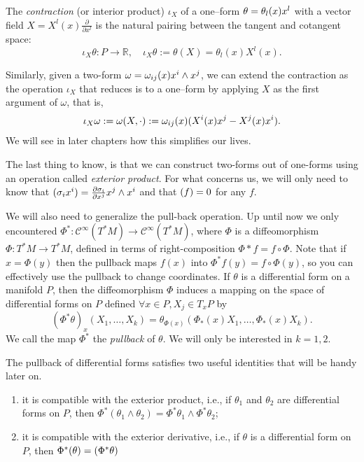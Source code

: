 \documentclass[english,fontsize=11pt,paper=a5,oneside]{scrbook}
\newcommand{\cC}{\mathcal{C}}
\newcommand{\R}{\mathbb{R}}
\let\d\relax
\newcommand{\d}{\mathrm{d}}
\theoremstyle{definition}
\begin{document}
The \emph{contraction} (or interior product) $\iota_X$ of a one--form $\theta = \theta_l(x)\d x^l$ with a vector field $X = X^l(x)\frac{\partial}{\partial x^l}$ is the natural pairing between the tangent and cotangent space:
\begin{equation}
  \iota_X \theta : P \to \R, \quad \iota_X \theta := \theta(X) = \theta_l(x) X^l(x).
\end{equation}

Similarly, given a two-form $\omega = \omega_{ij}(x) \d x^i\wedge \d x^j$, we can extend the contraction as the operation $\iota_X$ that reduces is to a one--form by applying $X$ as the first argument of $\omega$, that is,
\begin{equation}\label{eq:contraction}
  \iota_X \omega := \omega(X, \cdot) := \omega_{ij}(x)(X^i(x) \d x^j - X^j(x) \d x^i).
\end{equation}
We will see in later chapters how this simplifies our lives.

The last thing to know, is that we can construct two-forms out of one-forms using an operation called \emph{exterior product}.
For what concerns us, we will only need to know that $\d (\sigma_i \d x^i) = \frac{\partial \sigma_i}{\partial x^j} \d x^j \wedge \d x^i$ and that $\d (\d f) = 0$ for any $f$.

We will also need to generalize the pull-back operation.
Up until now we only encountered $\Phi^* : \cC^\infty(T^*M) \to \cC^\infty(T^*M)$, where $\Phi$ is a diffeomorphism $\Phi: T^*M \to T^*M$, defined in terms of right-composition $\Phi* f = f \circ \Phi$.
Note that if $x = \Phi(y)$ then the pullback maps $f(x)$ into $\Phi^* f (y) = f \circ \Phi (y)$, so you can effectively use the pullback to change coordinates.
%
If $\theta$ is a differential form on a manifold $P$, then the diffeomorphism $\Phi$ induces a mapping on the space of differential forms on $P$ defined $\forall x\in P, X_j\in T_xP$ by
\begin{equation}
  (\Phi^{*}\theta)_{x}(X_{1},\ldots ,X_{k})=\theta_{\Phi(x)}(\Phi_*(x)X_{1},\ldots,\Phi_*(x)X_{k}).
\end{equation}
We call the map $\Phi^*$ the \emph{pullback} of $\theta$. We will only be interested in $k=1,2$.

The pullback of differential forms satisfies two useful identities that will be handy later on.
\begin{enumerate}
  \item it is compatible with the exterior product, i.e., if $\theta_1$ and $\theta_2$ are differential forms on $P$, then $\Phi^{*}(\theta_1 \wedge \theta_2) = \Phi^{*}\theta_1 \wedge \Phi^{*}\theta_2$;
  \item it is compatible with the exterior derivative, i.e., if $\theta$ is a differential form on $P$, then $\Phi^{*}(\d\theta) = \d(\Phi^{*}\theta)$
\end{enumerate}
\end{document}

